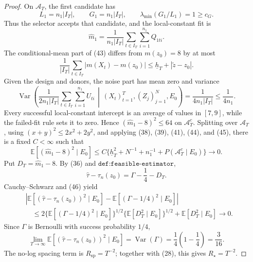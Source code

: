 \documentclass{article}
\begin{document}
\begin{proof}
On \(\mathcal A_T\), the first candidate has
\[
L_1=n_1|I_T|,
\qquad
G_1=n_1|I_T|,
\qquad
\lambda_{\min}(G_1/L_1)=1\ge c_G.
\tag{42}
\]
Thus the selector accepts that candidate, and the local-constant fit is
\[
\widehat m_1
=\frac1{n_1|I_T|}
\sum_{t\in I_T}\sum_{i=1}^{n_1}Q_{1ti}.
\tag{43}
\]
The conditional-mean part of (43) differs from \(m(z_0)=8\) by at most
\[
\frac1{|I_T|}\sum_{t\in I_T}|m(X_t)-m(z_0)|
\le\underline h_T+|\widetilde z-z_0|.
\tag{44}
\]
Given the design and donors, the noise part has mean zero and variance
\[
\operatorname{Var}\!\left(
\frac1{2n_1|I_T|}\sum_{t\in I_T}\sum_{i=1}^{n_1}U_{ti}
\,\middle|\,(X_t)_{t=1}^{T},(Z_j)_{j=1}^{N},E_0
\right)
=\frac1{4n_1|I_T|}
\le\frac1{4n_1}.
\tag{45}
\]
Every successful local-constant intercept is an average of values in \([7,9]\), while the failed-fit rule sets it to zero.  Hence \((\widehat m_1-8)^2\le64\) on \(\mathcal A_T^c\).  Splitting over \(\mathcal A_T\), using \((x+y)^2\le2x^2+2y^2\), and applying (38), (39), (41), (44), and (45), there is a fixed \(C<\infty\) such that
\[
\mathbb E[(\widehat m_1-8)^2\mid E_0]
\le C\{\underline h_T^2+N^{-1}+n_1^{-1}
+P(\mathcal A_T^c\mid E_0)\}
\longrightarrow0.
\tag{46}
\]
Put \(D_T=\widehat m_1-8\).  By (36) and \(\texttt{def:feasible-estimator}\),
\[
\widehat\tau-\tau_n(z_0)=\Gamma-\frac14-D_T.
\tag{47}
\]
Cauchy--Schwarz and (46) yield
\[
\begin{aligned}
&\left|
\mathbb E[(\widehat\tau-\tau_n(z_0))^2\mid E_0]
-\mathbb E[(\Gamma-1/4)^2\mid E_0]
\right|\\
&\quad\le
2\{\mathbb E[(\Gamma-1/4)^2\mid E_0]\}^{1/2}
\{\mathbb E[D_T^2\mid E_0]\}^{1/2}
+\mathbb E[D_T^2\mid E_0]
\longrightarrow0.
\end{aligned}
\tag{48}
\]
Since \(\Gamma\) is Bernoulli with success probability \(1/4\),
\[
\lim_{T\to\infty}
\mathbb E[(\widehat\tau-\tau_n(z_0))^2\mid E_0]
=\operatorname{Var}(\Gamma)
=\frac14\left(1-\frac14\right)
=\frac3{16}.
\tag{49}
\]
The no-log spacing term is \(R_{\mathrm{sp}}=T^{-2}\); together with (28), this gives \(R_\star=T^{-2}\).


\end{proof}
\end{document}
